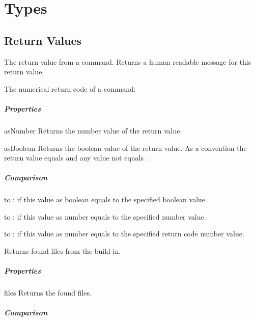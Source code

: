 \section{Types}

\subsection{Return Values}

\label{par:returnvalue}

The return value from a command. Returns a human readable message
for this return value.

\label{par:returnvalue}

The numerical return code of a command.

\subparagraph{Properties}

\begin{asparadesc}
%
\item[asNumber] Returns the number value of the return value.
%
\item[asBoolean] Returns the boolean value of the return value. As a convention the return
value  equals  and any value not  equals
.
%
\end{asparadesc}

\subparagraph{Comparison}

\begin{compactitem}
%
\item to : if this value as boolean equals to the specified boolean
value.
%
\item to : if this value as number equals to the specified number value.
%
\item to : if this value as number equals to the specified return code
number value.
%
\end{compactitem}

\label{par:fileslist}

Returns found files from the  build-in.

\subparagraph{Properties}

\begin{asparadesc}
%
\item[files] Returns the found files.
%
\end{asparadesc}

\subparagraph{Comparison}

